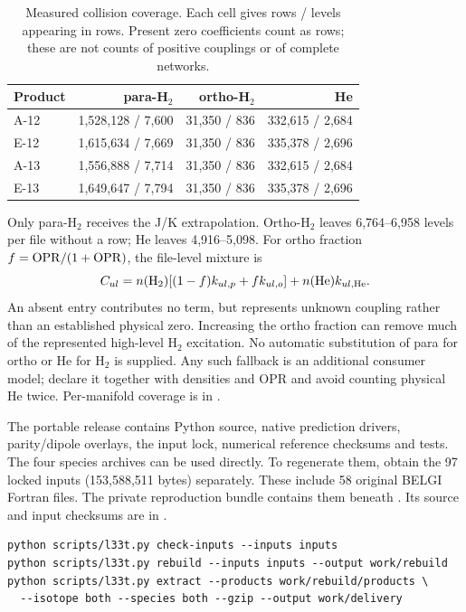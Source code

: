 \documentclass[11pt,a4paper]{article}
\begin{document}
\begin{table}[ht]
\centering\small
\caption{Measured collision coverage. Each cell gives rows / levels appearing
in rows. Present zero coefficients count as rows; these are not counts of
positive couplings or of complete networks.}
\label{tab:coverage}
\begin{tabular}{lrrr}
\toprule Product & para-H$_2$ & ortho-H$_2$ & He\\\midrule
A-12 & 1,528,128 / 7,600 & 31,350 / 836 & 332,615 / 2,684\\
E-12 & 1,615,634 / 7,669 & 31,350 / 836 & 335,378 / 2,696\\
A-13 & 1,556,888 / 7,714 & 31,350 / 836 & 332,615 / 2,684\\
E-13 & 1,649,647 / 7,794 & 31,350 / 836 & 335,378 / 2,696\\\bottomrule
\end{tabular}
\end{table}
Only para-H$_2$ receives the J/K extrapolation. Ortho-H$_2$ leaves
6,764--6,958 levels per file without a row; He leaves 4,916--5,098.
For ortho fraction $f={\rm OPR}/(1+{\rm OPR})$, the file-level mixture is
\begin{equation}
C_{ul}=n({\rm H}_2)[(1-f)k_{ul,p}+f k_{ul,o}]+n({\rm He})k_{ul,\mathrm{He}}.
\end{equation}
An absent entry contributes no term, but represents unknown coupling rather
than an established physical zero. Increasing the ortho fraction can remove
much of the represented high-level H$_2$ excitation. No automatic substitution
of para for ortho or He for H$_2$ is supplied. Any such fallback is an additional
consumer model; declare it together with densities and OPR and avoid counting
physical He twice. Per-manifold coverage is in
.

The portable release contains Python source, native prediction drivers,
parity/dipole overlays, the input lock, numerical reference checksums and
tests. The four species archives can be used directly. To regenerate them, obtain
the 97 locked inputs (153,588,511 bytes) separately. These include 58 original
BELGI Fortran files. The private reproduction bundle contains them beneath
. Its source and input checksums are in .

\begin{lstlisting}
python scripts/l33t.py check-inputs --inputs inputs
python scripts/l33t.py rebuild --inputs inputs --output work/rebuild
python scripts/l33t.py extract --products work/rebuild/products \
  --isotope both --species both --gzip --output work/delivery
\end{lstlisting}
\end{document}
